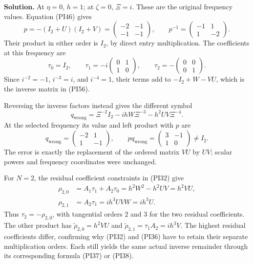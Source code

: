 \documentclass[
  11pt,
]{article}
\begin{document}
\textbf{Solution.} At \(\eta=0\), \(h=1\); at \(\zeta=0\), \(\Xi=i\).
These are the original frequency values. Equation (PI46) gives \[
 p=-(I_2+U)(I_2+V)
 =\begin{pmatrix}-2&-1\\-1&-1\end{pmatrix},\qquad
 p^{-1}=\begin{pmatrix}-1&1\\1&-2\end{pmatrix}.
 \tag{PI56}
\] Their product in either order is \(I_2\), by direct entry
multiplication. The coefficients at this frequency are \[
 \tau_0=I_2,\qquad
 \tau_1=-i\begin{pmatrix}0&1\\1&0\end{pmatrix},\qquad
 \tau_2=-\begin{pmatrix}0&0\\0&1\end{pmatrix}.
 \tag{PI57}
\] Since \(i^{-2}=-1\), \(i^{-3}=i\), and \(i^{-4}=1\), their terms add
to \(-I_2+W-VU\), which is the inverse matrix in (PI56).

Reversing the inverse factors instead gives the different symbol \[
 q_{\mathrm{wrong}}
 =\Xi^{-2}I_2-ihW\Xi^{-3}-h^2UV\Xi^{-4}.
 \tag{PI58}
\] At the selected frequency its value and left product with \(p\) are
\[
 q_{\mathrm{wrong}}=
 \begin{pmatrix}-2&1\\1&-1\end{pmatrix},\qquad
 p q_{\mathrm{wrong}}=
 \begin{pmatrix}3&-1\\1&0\end{pmatrix}\ne I_2.
 \tag{PI59}
\] The error is exactly the replacement of the ordered matrix \(VU\) by
\(UV\); scalar powers and frequency coordinates were unchanged.

For \(N=2\), the residual coefficient constraints in (PI32) give \[
 \begin{split}
 \rho_{2,0}
 &=A_1\tau_1+A_2\tau_0
 =h^2W^2-h^2UV=h^2VU,\\
 \rho_{2,1}
 &=A_2\tau_1=ih^3UVW=ih^3U.
 \end{split}
 \tag{PI60}
\] Thus \(\tau_2=-\rho_{2,0}\), with tangential orders \(2\) and \(3\)
for the two residual coefficients. The other product has
\(\widetilde\rho_{2,0}=h^2VU\) and
\(\widetilde\rho_{2,1}=\tau_1A_2=ih^3V\). The highest residual
coefficients differ, confirming why (PI32) and (PI36) have to retain
their separate multiplication orders. Each still yields the same actual
inverse remainder through its corresponding formula (PI37) or (PI38).
\end{document}

